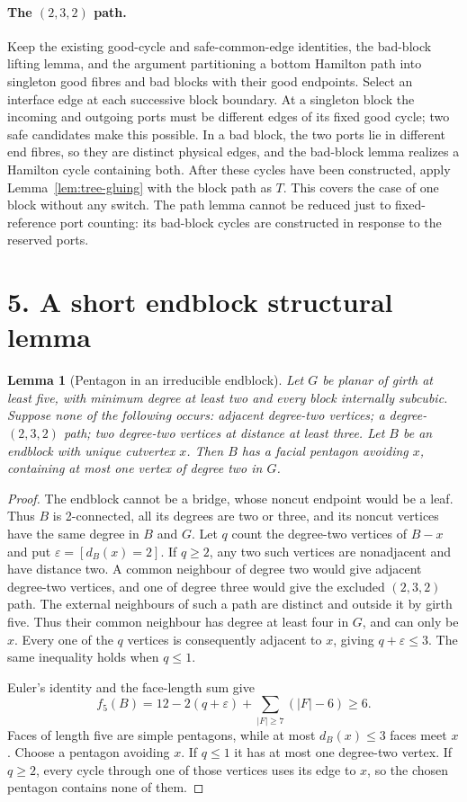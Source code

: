 \documentclass[11pt]{article}
\newtheorem{lemma}{Lemma}
\theoremstyle{remark}\newtheorem{remark}[lemma]{Remark}
\begin{document}
\paragraph{The $(2,3,2)$ path.}
Keep the existing good-cycle and safe-common-edge identities, the
bad-block lifting lemma, and the argument partitioning a bottom
Hamilton path into singleton good fibres and bad blocks with their
good endpoints. Select an interface edge at each successive block
boundary. At a singleton block the incoming and outgoing ports must
be different edges of its fixed good cycle; two safe candidates make
this possible. In a bad block, the two ports lie in different end
fibres, so they are distinct physical edges, and the bad-block lemma
realizes a Hamilton cycle containing both. After these cycles have
been constructed, apply Lemma~\ref{lem:tree-gluing} with the block
path as $T$. This covers the case of one block without any switch.
The path lemma cannot be reduced just to fixed-reference port counting:
its bad-block cycles are constructed in response to the reserved ports.

\section*{5. A short endblock structural lemma}

\begin{lemma}[Pentagon in an irreducible endblock]\label{lem:endblock}
Let $G$ be planar of girth at least five, with minimum degree at least
two and every block internally subcubic. Suppose none of the following
occurs: adjacent degree-two vertices; a degree-$(2,3,2)$ path; two
degree-two vertices at distance at least three. Let $B$ be an endblock
with unique cutvertex $x$. Then $B$ has a facial pentagon avoiding
$x$, containing at most one vertex of degree two in $G$.
\end{lemma}
\begin{proof}
The endblock cannot be a bridge, whose noncut endpoint would be a
leaf. Thus $B$ is 2-connected, all its degrees are two or three, and
its noncut vertices have the same degree in $B$ and $G$.
Let $q$ count the degree-two vertices of $B-x$ and put
$\varepsilon=[d_B(x)=2]$. If $q\ge2$, any two such vertices are
nonadjacent and have distance two. A common neighbour of degree two
would give adjacent degree-two vertices, and one of degree three
would give the excluded $(2,3,2)$ path. The external neighbours of
such a path are distinct and outside it by girth five. Thus their
common neighbour has degree at least four in $G$, and can only be
$x$. Every one of the $q$ vertices is consequently adjacent to $x$,
giving $q+\varepsilon\le3$. The same inequality holds when $q\le1$.

Euler's identity and the face-length sum give
\[
 f_5(B)=12-2(q+\varepsilon)+
             \sum_{|F|\ge7}(|F|-6)\ge6.
\]
Faces of length five are simple pentagons, while at most
$d_B(x)\le3$ faces meet $x$. Choose a pentagon avoiding $x$.
If $q\le1$ it has at most one degree-two vertex. If $q\ge2$, every
cycle through one of those vertices uses its edge to $x$, so the
chosen pentagon contains none of them.
\end{proof}
\end{document}
